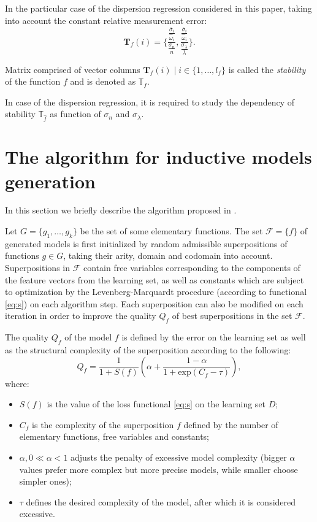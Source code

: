 \documentclass[11pt,a4paper]{article}
\theoremstyle{definition}
\begin{document}
In the particular case of the dispersion regression considered in this paper, taking into account
the constant relative measurement error:
\[
  \mathbf{T}_f(i) = \Big\{ \frac{\frac{\overline{\sigma}_i}{\hat{\omega}_i}}{\frac{\sigma_n}{n}}, \frac{\frac{\overline{\sigma}_i}{\hat{\omega}_i}}{\frac{\sigma_{\lambda}}{\lambda}} \Big\}.
\]

Matrix comprised of vector columns $\mathbf{T}_f(i) \mid i \in \{ 1, \dots, l_f \}$
is called the \emph{stability} of the function $f$ and is denoted as $\mathbb{T}_f$.

In case of the dispersion regression, it is required to study the dependency of stability
$\mathbb{T}_{\hat{f}}$ as function of $\sigma_n$ and $\sigma_{\lambda}$.

\section{The algorithm for inductive models generation}

In this section we briefly describe the algorithm proposed in \cite{Rudoy13}.

Let $G = \{ g_1, \dots, g_k \}$ be the set of some elementary functions.
The set $\mathcal{F} = \{ f \}$ of generated models is first initialized
by random admissible superpositions of functions $g \in G$, taking their
arity, domain and codomain into account. Superpositions in $\mathcal{F}$
contain free variables corresponding to the components of the feature
vectors from the learning set, as well as constants which are subject to
optimization by the Levenberg-Marquardt procedure (according to functional
\eqref{eq:s}) on each algorithm step. Each superposition can also be modified
on each iteration in order to improve the quality $Q_f$ of best superpositions
in the set $\mathcal{F}$.

The quality $Q_f$ of the model $f$ is defined by the error on the learning
set as well as the structural complexity of the superposition according to the
following:
\begin{equation}
  Q_f = \frac{1}{1 + S(f)} \left(\alpha + \frac{1 - \alpha}{1 + \text{exp} (C_f - \tau)}\right),
  \label{eq:s_f}
\end{equation}
where:
\begin{itemize}
  \item[] $S(f)$ is the value of the loss functional \eqref{eq:s} on the learning set $D$;
  \item[] $C_f$ is the complexity of the superposition $f$ defined by the number of
	elementary functions, free variables and constants;
  \item[] $\alpha, 0 \ll \alpha < 1$ adjusts the penalty of excessive model complexity
	(bigger $\alpha$ values prefer more complex but more precise models, while smaller
	choose simpler ones);
  \item[] $\tau$ defines the desired complexity of the model, after which it is considered
	excessive.
\end{itemize}
\end{document}
